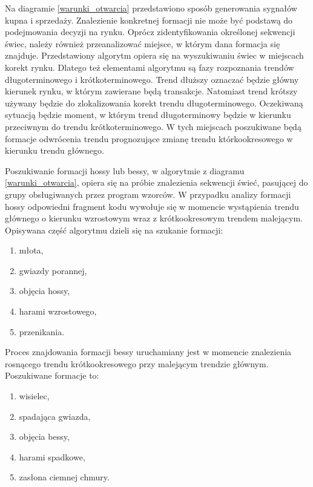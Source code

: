 \documentclass[pdflatex,11pt]{aghdpl}
\begin{document}
Na diagramie \ref{warunki_otwarcia} przedstawiono sposób generowania sygnałów kupna i sprzedaży. Znalezienie konkretnej formacji nie może być podstawą do podejmowania decyzji na rynku. Oprócz zidentyfikowania określonej sekwencji świec, należy również przeanalizować miejsce, w którym dana formacja się znajduje. Przedstawiony algorytm opiera się na wyszukiwaniu świec w miejscach korekt rynku. Dlatego też elementami algorytmu są fazy rozpoznania trendów długoterminowego i krótkoterminowego. Trend dłuższy oznaczać będzie główny kierunek rynku, w którym zawierane będą transakcje. Natomiast trend krótszy używany będzie do zlokalizowania korekt trendu długoterminowego. Oczekiwaną sytuacją będzie moment, w którym trend długoterminowy będzie w kierunku przeciwnym do trendu krótkoterminowego. W tych miejscach poszukiwane będą formacje odwrócenia trendu prognozujące zmianę trendu którkookresowego w kierunku trendu głównego. 


Poszukiwanie formacji hossy lub bessy, w algorytmie z diagramu \ref{warunki_otwarcia}, opiera się na próbie znalezienia sekwencji świeć, pasującej do grupy obsługiwanych przez program wzorców. W przypadku analizy formacji hossy odpowiedni fragment kodu wywołuje się w momencie wystąpienia trendu głównego o kierunku wzrostowym wraz z krótkookresowym trendem malejącym. Opisywana część algorytmu dzieli się na szukanie formacji:
\begin{enumerate}
\item młota,
\item gwiazdy porannej,
\item objęcia hossy,
\item harami wzrostowego,
\item przenikania.
\end{enumerate}

Proces znajdowania formacji bessy uruchamiany jest w momencie znalezienia rosnącego trendu krótkookresowego przy malejącym trendzie głównym. Poszukiwane formacje to:
\begin{enumerate}
\item wisielec,
\item spadająca gwiazda,
\item objęcia bessy,
\item harami spadkowe,
\item zasłona ciemnej chmury.
\end{enumerate}
\end{document}
